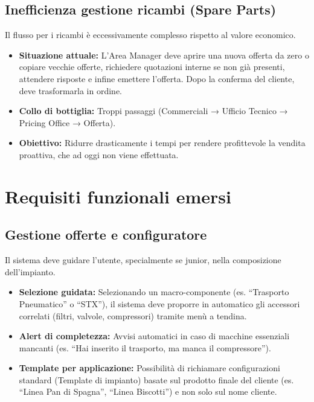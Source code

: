 \subsection{Inefficienza gestione ricambi (Spare Parts)}
Il flusso per i ricambi è eccessivamente complesso rispetto al valore economico.
\begin{itemize}
      \item \textbf{Situazione attuale:} L'Area Manager deve aprire una nuova offerta da zero o copiare
            vecchie offerte, richiedere
            quotazioni interne se non già presenti, attendere risposte e infine emettere l'offerta.
            Dopo la conferma del cliente, deve trasformarla in ordine.
      \item \textbf{Collo di bottiglia:} Troppi passaggi (Commerciali → Ufficio Tecnico → Pricing Office → Offerta).
      \item \textbf{Obiettivo:} Ridurre drasticamente i tempi per rendere profittevole la vendita proattiva,
            che ad oggi non viene effettuata.
\end{itemize}

\section{Requisiti funzionali emersi}

\subsection{Gestione offerte e configuratore}
Il sistema deve guidare l'utente, specialmente se junior, nella composizione
dell'impianto.
\begin{itemize}
      \item \textbf{Selezione guidata:} Selezionando un macro-componente (es. ``Trasporto Pneumatico'' o ``STX''),
            il sistema deve proporre in automatico gli accessori correlati (filtri, valvole, compressori) tramite menù a tendina.
      \item \textbf{Alert di completezza:} Avvisi automatici in caso di macchine essenziali mancanti
            (es. ``Hai inserito il trasporto, ma manca il compressore'').
      \item \textbf{Template per applicazione:} Possibilità di richiamare configurazioni standard (Template di impianto)
            basate sul prodotto finale del cliente (es. ``Linea Pan di Spagna'', ``Linea Biscotti'') e non solo sul nome cliente.
\end{itemize}


